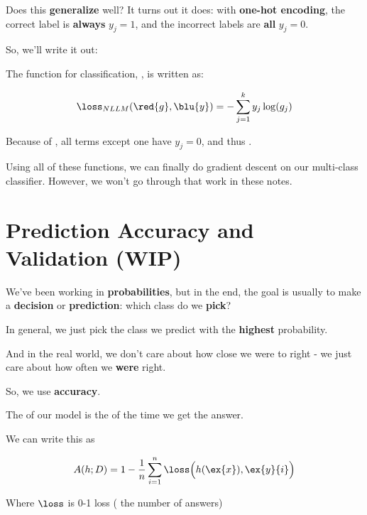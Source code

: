         Does this \textbf{generalize} well? It turns out it does: with \textbf{one-hot encoding}, the correct label is \textbf{always} $y_j=1$, and the incorrect labels are \textbf{all} $y_j=0$. 
        
        So, we'll write it out:\\
        
        \begin{kequation}
            The  function for  classification, , is written as:
            
            \begin{equation*}
                \loss_{NLLM}
                (\red{g} , \blu{y})
                =
                -\sum_{j=1}^k
                y_j \log(g_j)
            \end{equation*}
            
            Because of , all terms except one have $y_j=0$, and thus .
        \end{kequation}
        
        Using all of these functions, we can finally do gradient descent on our multi-class classifier. However, we won't go through that work in these notes.


\pagebreak

\section{Prediction Accuracy and Validation (WIP)}

    We've been working in \textbf{probabilities}, but in the end, the goal is usually to make a \textbf{decision} or \textbf{prediction}: which class do we \textbf{pick}?
    
    In general, we just pick the class we predict with the \textbf{highest} probability.
    
    And in the real world, we don't care about how close we were to right - we just care about how often we \textbf{were} right.
    
    So, we use \textbf{accuracy}.\\
    
    \begin{definition}
        The  of our model is the  of the time we get the  answer.
        
        We can write this as 
        
        \begin{equation}
            A(h;D) = 1 - \frac{1}{n} \sum_{i=1}^n \loss\Big(h(\ex{x}),\ex{y}{i} \Big)
        \end{equation}
        
        Where $\loss$ is 0-1 loss ( the number of  answers)
    \end{definition}
    
